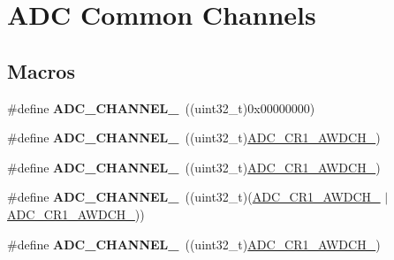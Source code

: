 \hypertarget{group___a_d_c__channels}{}\section{A\+DC Common Channels}
\label{group___a_d_c__channels}
\subsection*{Macros}
\begin{DoxyCompactItemize}
\item 
\#define {\bfseries A\+D\+C\+\_\+\+C\+H\+A\+N\+N\+E\+L\+\_}~((uint32\+\_\+t)0x00000000)\hypertarget{group___a_d_c__channels_ga3c5075aee5af4eae02f1a72d6216199c}{}\label{group___a_d_c__channels_ga3c5075aee5af4eae02f1a72d6216199c}

\item 
\#define {\bfseries A\+D\+C\+\_\+\+C\+H\+A\+N\+N\+E\+L\+\_}~((uint32\+\_\+t)\hyperlink{group___peripheral___registers___bits___definition_ga18725d77c35c173cdb5bdab658d9dace}{A\+D\+C\+\_\+\+C\+R1\+\_\+\+A\+W\+D\+C\+H\+\_})\hypertarget{group___a_d_c__channels_gaeb119201733a871c94971c51843ffaac}{}\label{group___a_d_c__channels_gaeb119201733a871c94971c51843ffaac}

\item 
\#define {\bfseries A\+D\+C\+\_\+\+C\+H\+A\+N\+N\+E\+L\+\_}~((uint32\+\_\+t)\hyperlink{group___peripheral___registers___bits___definition_gafcd37244d74db7c9a34a4f08b94301ae}{A\+D\+C\+\_\+\+C\+R1\+\_\+\+A\+W\+D\+C\+H\+\_})\hypertarget{group___a_d_c__channels_gad576132ebd78a3429be34f44e474c914}{}\label{group___a_d_c__channels_gad576132ebd78a3429be34f44e474c914}

\item 
\#define {\bfseries A\+D\+C\+\_\+\+C\+H\+A\+N\+N\+E\+L\+\_}~((uint32\+\_\+t)(\hyperlink{group___peripheral___registers___bits___definition_gafcd37244d74db7c9a34a4f08b94301ae}{A\+D\+C\+\_\+\+C\+R1\+\_\+\+A\+W\+D\+C\+H\+\_} $\vert$ \hyperlink{group___peripheral___registers___bits___definition_ga18725d77c35c173cdb5bdab658d9dace}{A\+D\+C\+\_\+\+C\+R1\+\_\+\+A\+W\+D\+C\+H\+\_}))\hypertarget{group___a_d_c__channels_ga56dba5d35f1f7bcad41e4f9a7da3b125}{}\label{group___a_d_c__channels_ga56dba5d35f1f7bcad41e4f9a7da3b125}

\item 
\#define {\bfseries A\+D\+C\+\_\+\+C\+H\+A\+N\+N\+E\+L\+\_}~((uint32\+\_\+t)\hyperlink{group___peripheral___registers___bits___definition_ga625eebdc95937325cad90a151853f5a0}{A\+D\+C\+\_\+\+C\+R1\+\_\+\+A\+W\+D\+C\+H\+\_})\hypertarget{group___a_d_c__channels_ga66f19737ad81a0a62eb97854d0e41a54}{}\label{group___a_d_c__channels_ga66f19737ad81a0a62eb97854d0e41a54}


\end{DoxyCompactItemize}
